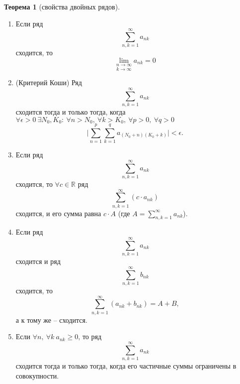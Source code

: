 \documentclass{report}
\theoremstyle{definition}
\newtheorem{theorem}{Теорема}[section]
\begin{document}
\begin{theorem}[свойства двойных рядов]
  \begin{enumerate}
    \item Если ряд
          \begin{equation*}
            \sum_{n,k=1}^{\infty}a_{nk}
          \end{equation*}
          сходится, то
          \begin{equation*}
            \underset{k\rightarrow\infty}{\underset{n\rightarrow\infty}{\lim}}a_{nk} = 0
          \end{equation*}

    \item (Критерий Коши)
          Ряд
          \begin{equation*}
            \sum_{n,k=1}^{\infty}a_{nk}
          \end{equation*}
          сходится тогда и только тогда, когда $\forall \epsilon > 0 \ \exists N_0,K_0: \ \forall n > N_0, \ \forall k > K_0, \ \forall p > 0, \ \forall q > 0$
          \begin{equation*}
            \bigg|\sum_{n=1}^{p}\sum_{k=1}^{q}a_{(N_0 + n)(K_0 + k)}\bigg| < \epsilon.
          \end{equation*}

    \item Если ряд
          \begin{equation*}
            \sum_{n,k=1}^{\infty}a_{nk}
          \end{equation*}
          сходится, то $\forall c \in \mathbb{R}$ ряд
          \begin{equation*}
            \sum_{n,k=1}^{\infty}(c\cdot a_{nk})
          \end{equation*}
          сходится, и его сумма равна $c\cdot A$ (где $A = \sum_{n,k=1}^{\infty}a_{nk}$).

    \item Если ряд
          \begin{equation*}
            \sum_{n,k=1}^{\infty}a_{nk}
          \end{equation*}
          сходится и ряд
          \begin{equation*}
            \sum_{n,k=1}^{\infty}b_{nk}
          \end{equation*}
          сходится, то
          \begin{equation*}
            \sum_{n,k=1}^{\infty}(a_{nk} + b_{nk}) = A + B,
          \end{equation*}
          а к тому же -- сходится.

    \item Если $\forall n, \ \forall k \ a_{nk} \geqslant 0$, то ряд
          \begin{equation*}
            \sum_{n,k=1}^{\infty}a_{nk}
          \end{equation*}
          сходится тогда и только тогда, когда его частичные суммы ограничены в совокупности.
  \end{enumerate}
\end{theorem}
\end{document}
